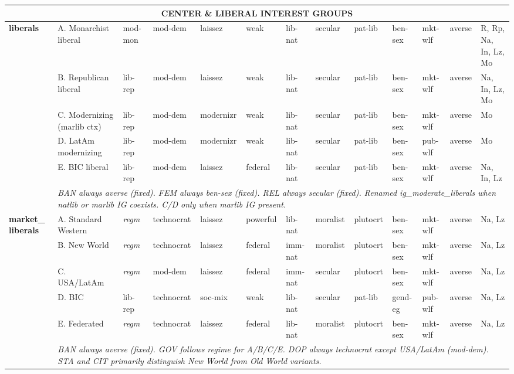 \documentclass[a4paper]{article}
\newcommand{\reg}{\textit{regm}}
\newcommand{\minorrow}[2]{\rowcolor{minorRow} #1 & \multicolumn{12}{p{22cm}|}{\textit{#2}} \\}
\begin{document}
\begin{footnotesize}
\begin{longtable}{|p{1.8cm}|p{2.3cm}|p{1.55cm}|p{1.65cm}|p{1.65cm}|p{1.3cm}|p{1.5cm}|p{1.5cm}|p{1.5cm}|p{1.3cm}|p{1.45cm}|p{1.0cm}|p{2.65cm}|}
\multicolumn{13}{|c|}{\cellcolor{grpRow}\bfseries CENTER \& LIBERAL INTEREST GROUPS} \\
\hline

\multirow{6}{*}{\cellcolor{centerHdr}\textbf{liberals}} &
  A. Monarchist liberal & mod-mon & mod-dem & laissez & weak & lib-nat & secular & pat-lib & ben-sex & mkt-wlf & averse & R, Rp, Na, In, Lz, Mo \\ \cline{2-13}
\cellcolor{centerHdr} &
  B. Republican liberal & lib-rep & mod-dem & laissez & weak & lib-nat & secular & pat-lib & ben-sex & mkt-wlf & averse & Na, In, Lz, Mo \\ \cline{2-13}
\cellcolor{centerHdr} &
  C. Modernizing (marlib ctx) & lib-rep & mod-dem & modernizr & weak & lib-nat & secular & pat-lib & ben-sex & mkt-wlf & averse & Mo \\ \cline{2-13}
\cellcolor{centerHdr} &
  D. LatAm modernizing & lib-rep & mod-dem & modernizr & weak & lib-nat & secular & pat-lib & ben-sex & pub-wlf & averse & Mo \\ \cline{2-13}
\cellcolor{centerHdr} &
  E. BIC liberal & lib-rep & mod-dem & laissez & federal & lib-nat & secular & pat-lib & ben-sex & mkt-wlf & averse & Na, In, Lz \\ \cline{2-13}
\minorrow{\cellcolor{centerHdr}}{BAN always averse (fixed). FEM always ben-sex (fixed). REL always secular (fixed). Renamed ig\_moderate\_liberals when natlib or marlib IG coexists. C/D only when marlib IG present.}
\hline

\multirow{6}{*}{\cellcolor{centerHdr}\textbf{market\_ liberals}} &
  A. Standard Western & \reg & technocrat & laissez & powerful & lib-nat & moralist & plutocrt & ben-sex & mkt-wlf & averse & Na, Lz \\ \cline{2-13}
\cellcolor{centerHdr} &
  B. New World & \reg & technocrat & laissez & federal & imm-nat & moralist & plutocrt & ben-sex & mkt-wlf & averse & Na, Lz \\ \cline{2-13}
\cellcolor{centerHdr} &
  C. USA/LatAm & \reg & mod-dem & laissez & federal & imm-nat & secular & plutocrt & ben-sex & mkt-wlf & averse & Na, Lz \\ \cline{2-13}
\cellcolor{centerHdr} &
  D. BIC & lib-rep & technocrat & soc-mix & weak & lib-nat & secular & pat-lib & gend-eg & pub-wlf & averse & Na, Lz \\ \cline{2-13}
\cellcolor{centerHdr} &
  E. Federated & \reg & technocrat & laissez & federal & lib-nat & moralist & plutocrt & ben-sex & mkt-wlf & averse & Na, Lz \\ \cline{2-13}
\minorrow{\cellcolor{centerHdr}}{BAN always averse (fixed). GOV follows regime for A/B/C/E. DOP always technocrat except USA/LatAm (mod-dem). STA and CIT primarily distinguish New World from Old World variants.}
\hline


\end{longtable}
\end{footnotesize}
\end{document}
